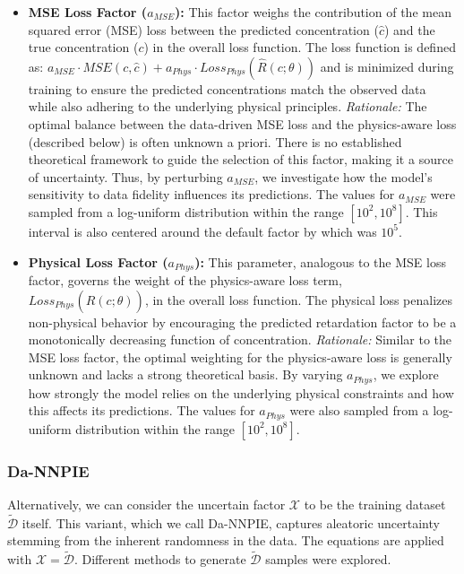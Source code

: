 \begin{itemize}
    \item \textbf{MSE Loss Factor ($a_{MSE}$):} This factor weighs the contribution of the mean squared error (MSE) loss between the predicted concentration ($\hat{c}$) and the true concentration ($c$) in the overall loss function. The loss function is defined as: $a_{MSE} \cdot MSE(c, \hat{c}) + a_{Phys} \cdot Loss_{Phys}(\hat{R}(c;\theta))$ and is minimized during training to ensure the predicted concentrations match the observed data while also adhering to the underlying physical principles. \textit{Rationale:} The optimal balance between the data-driven MSE loss and the physics-aware loss (described below) is often unknown a priori. There is no established theoretical framework to guide the selection of this factor, making it a source of uncertainty. Thus, by perturbing $a_{MSE}$, we investigate how the model's sensitivity to data fidelity influences its predictions. The values for $a_{MSE}$ were sampled from a log-uniform distribution within the range $[10^2, 10^8]$. This interval is also centered around the default factor by \textcite{finn} which was $10^5$.
    \item \textbf{Physical Loss Factor ($a_{Phys}$):} This parameter, analogous to the MSE loss factor, governs the weight of the physics-aware loss term, $Loss_{Phys}(\hat{R}(c;\theta))$, in the overall loss function. The physical loss penalizes non-physical behavior by encouraging the predicted retardation factor to be a monotonically decreasing function of concentration. \textit{Rationale:} Similar to the MSE loss factor, the optimal weighting for the physics-aware loss is generally unknown and lacks a strong theoretical basis. By varying $a_{Phys}$, we explore how strongly the model relies on the underlying physical constraints and how this affects its predictions. The values for $a_{Phys}$ were also sampled from a log-uniform distribution within the range $[10^2, 10^8]$.
\end{itemize}



\subsubsection{Da-NNPIE}

Alternatively, we can consider the uncertain factor $\mathcal{X}$ to be the training dataset $\tilde{\mathcal{D}}$ itself. This variant, which we call Da-NNPIE, captures aleatoric uncertainty stemming from the inherent randomness in the data. The equations are applied with $\mathcal{X} = \tilde{\mathcal{D}}$. Different methods to generate $\tilde{\mathcal{D}}$ samples were explored.


